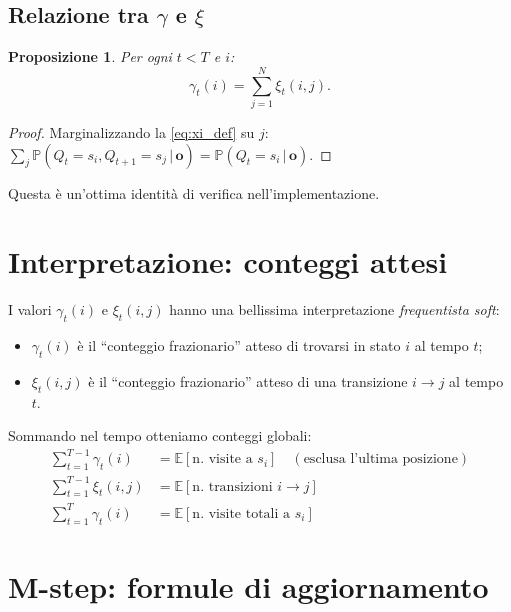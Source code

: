 \documentclass[11pt,a4paper,oneside]{book}
\theoremstyle{plain}
\newtheorem{proposizione}[teorema]{Proposizione}
\theoremstyle{definition}
\theoremstyle{remark}
\newcommand{\E}{\mathbb{E}}
\newcommand{\Prob}{\mathbb{P}}
\newcommand{\Nstates}{N}                     %
\newcommand{\Tlen}{T}                        %
\newcommand{\seqobs}{\mathbf{o}}             %
\newcommand{\gam}{\gamma}                    %
\newcommand{\xig}{\xi}                       %
\newcommand{\given}{\,\vert\,}
\begin{document}
\subsection{Relazione tra \texorpdfstring{$\gam$}{gamma} e \texorpdfstring{$\xig$}{xi}}

\begin{proposizione}\label{prop:gamma_xi}
Per ogni $t<\Tlen$ e $i$:
\begin{equation}
\gam_t(i) = \sum_{j=1}^{\Nstates}\xig_t(i,j).
\end{equation}
\end{proposizione}

\begin{proof}
Marginalizzando la \eqref{eq:xi_def} su $j$:
$\sum_j \Prob(Q_t=s_i,Q_{t+1}=s_j\given\seqobs) = \Prob(Q_t=s_i\given\seqobs)$.
\end{proof}

Questa è un'ottima identità di verifica nell'implementazione.

\section{Interpretazione: conteggi attesi}

I valori $\gam_t(i)$ e $\xig_t(i,j)$ hanno una bellissima
interpretazione \emph{frequentista soft}:

\begin{itemize}[leftmargin=*]
    \item $\gam_t(i)$ è il ``conteggio frazionario'' atteso di trovarsi
          in stato $i$ al tempo $t$;
    \item $\xig_t(i,j)$ è il ``conteggio frazionario'' atteso di una
          transizione $i\to j$ al tempo $t$.
\end{itemize}

Sommando nel tempo otteniamo conteggi globali:
\begin{align}
    \sum_{t=1}^{\Tlen-1}\gam_t(i) &= \E[\text{n. visite a } s_i] \quad
    (\text{esclusa l'ultima posizione})\\
    \sum_{t=1}^{\Tlen-1}\xig_t(i,j) &= \E[\text{n. transizioni } i\to j]\\
    \sum_{t=1}^{\Tlen}\gam_t(i) &= \E[\text{n. visite totali a } s_i]
\end{align}

\section{M-step: formule di aggiornamento}
\end{document}
